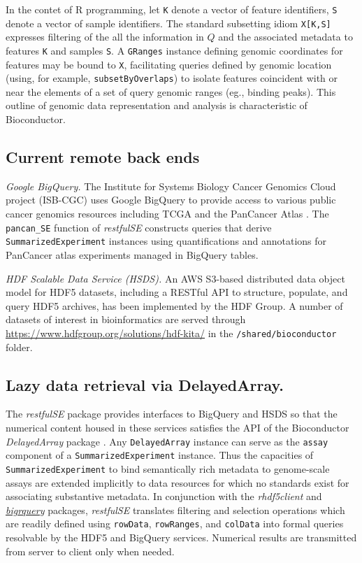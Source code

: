 \documentclass[applications]{gen-bioinformatics}
\newcommand{\Biocpackage}[1]{{\textit{#1}}}
\newcommand{\BiocpackageFirst}[1]{{\textit{#1}}}
\newcommand{\CRANpackageFirst}[1]{{\emph{\href{https://cran.r-project.org/web/packages/#1/index.html}{#1}}}}
\begin{document}
In the contet of R programming, let
\texttt{K} denote a vector of feature identifiers,
\texttt{S} denote a vector of sample identifiers.
The standard subsetting idiom \texttt{X[K,S]} expresses filtering of 
the all the information in $Q$ and the associated metadata
to features \texttt{K} and samples \texttt{S}.  A \texttt{GRanges} 
instance \citep{Lawrence2013} defining genomic coordinates for features may be bound to \texttt{X},
facilitating queries defined by genomic location (using, for example, \texttt{subsetByOverlaps}) to isolate features
coincident with or near the elements of a set of query genomic ranges (eg., binding peaks).  This outline of genomic data representation
and analysis is characteristic of Bioconductor.

\subsection*{Current remote back ends}

\textit{Google BigQuery.} The Institute for Systems Biology Cancer
Genomics Cloud project (ISB-CGC) \citep{ISBCGC} uses 
Google BigQuery to provide access to
various public cancer genomics resources including
TCGA and the PanCancer Atlas \citep{Hoadley2018}.
The \verb+pancan_SE+
function of \Biocpackage{restfulSE} constructs queries that derive
\texttt{SummarizedExperiment} instances using quantifications and annotations
for PanCancer atlas experiments
managed in BigQuery tables.  

\noindent
\textit{HDF Scalable Data Service (HSDS).}
An AWS S3-based distributed data object model for
HDF5 datasets, including a
RESTful API to structure, populate, and query HDF5 archives, 
has been implemented by the HDF Group. 
A number of datasets of interest in bioinformatics
are served through \url{https://www.hdfgroup.org/solutions/hdf-kita/}
in the \texttt{/shared/bioconductor} folder.

\subsection*{Lazy data retrieval via DelayedArray.}

The \Biocpackage{restfulSE} package provides interfaces to 
BigQuery and HSDS so that 
the numerical content housed in these services
satisfies the API of the Bioconductor \BiocpackageFirst{DelayedArray} package \citep{Pages2018}.  
Any \verb+DelayedArray+ instance can serve as the \verb+assay+
component of a \texttt{SummarizedExperiment} instance.  Thus the
capacities of \verb+SummarizedExperiment+ to bind semantically
rich metadata to genome-scale assays are extended implicitly to
data resources for which no standards exist for
associating substantive metadata.  
In conjunction with the \BiocpackageFirst{rhdf5client} \citep{rclient} and \CRANpackageFirst{bigrquery} \citep{bigr} packages,
\Biocpackage{restfulSE} translates filtering and selection operations
which are readily defined using \verb+rowData+, \verb+rowRanges+,
and \verb+colData+ into formal queries resolvable by the HDF5 and
BigQuery services.  Numerical results are transmitted from
server to client only when needed.
\end{document}
